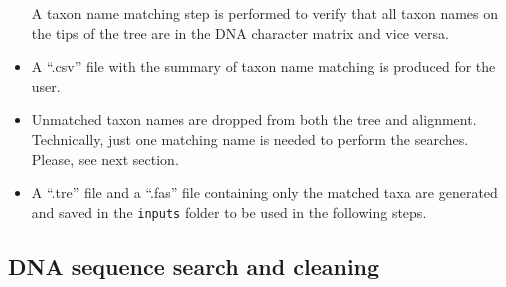 \documentclass[]{article}
\begin{document}
\begin{itemize}
  A taxon name matching step is performed to verify that all taxon names on the tips
  of the tree are in the DNA character matrix and vice versa.
\item
  A ``.csv'' file with the summary of taxon name matching is produced for the user.
\item
  Unmatched taxon names are dropped from both the tree and alignment.
  Technically, just one matching name is needed to perform the searches. Please, see next section.
\item
  A ``.tre'' file and a ``.fas'' file containing only the matched taxa are generated and saved in the \texttt{inputs} folder to be used in the following steps.
\end{itemize}

\hypertarget{dna-sequence-search-and-cleaning}{%
\subsection{DNA sequence search and cleaning}\label{dna-sequence-search-and-cleaning}}
\end{document}
